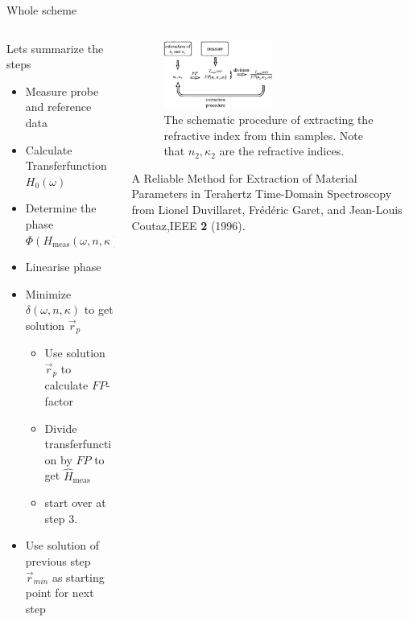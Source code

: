 \documentclass[aspectratio=1610, 9pt]{beamer}
\begin{document}
\begin{frame}{Whole scheme}
  \begin{columns}
    \begin{column}{0.5\textwidth}
      Lets summarize the steps
      \begin{itemize}
        \item[1.] Measure probe and reference data 
        \item[2.] Calculate Transferfunction $H_0(\omega)$
        \item[3.] Determine the phase $\Phi(H_\text{meas}(\omega, n, \kappa))$
        \item[4.] Linearise phase
        \item[5.] Minimize $\delta(\omega, n, \kappa)$ to get solution $\vec{r}_p$
        \begin{itemize}
          \item[a)] Use solution $\vec{r}_p$ to calculate $FP$-factor 
          \item[b)] Divide transferfunction by $FP$ to get $\hat{H}_\text{meas}$
          \item[c)] start over at step 3. 
        \end{itemize}
        \item[6.] Use solution of previous step $\vec{r}_{min}$ as starting point for next step 
      \end{itemize}
    \end{column}
    \begin{column}{0.5\textwidth}
      \begin{figure}
        \includegraphics[width=0.5\textwidth]{images/procedure_fp.jpg}
        \caption{The schematic procedure of extracting the refractive index from thin samples. Note that $n_2, \kappa_2$ are the refractive indices.}
      \end{figure}
      \textcolor{tugreen}{A Reliable Method for Extraction of Material Parameters in Terahertz Time-Domain Spectroscopy} from Lionel Duvillaret, Frédéric Garet, and Jean-Louis Coutaz,IEEE \textbf{2} (1996).
  \end{column}
\end{columns}
\end{frame}
\end{document}
